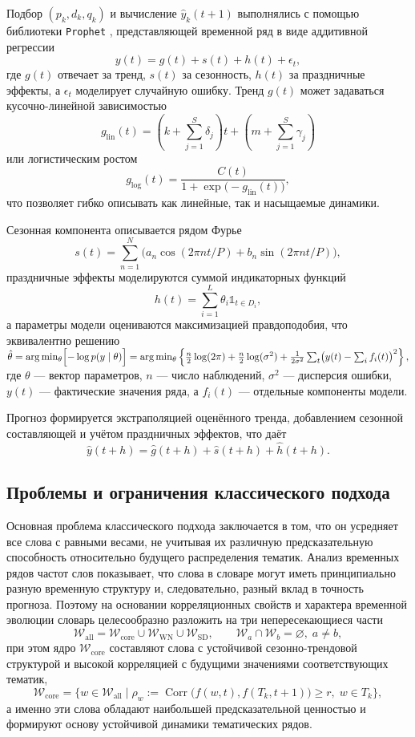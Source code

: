 \documentclass[14pt,a4paper]{article}
\begin{document}
Подбор $(p_k,d_k,q_k)$ и вычисление $\widehat{y}_k(t+1)$ выполнялись с помощью библиотеки \texttt{Prophet} \cite{prophet}, представляющей временной ряд в виде аддитивной регрессии
\[
y(t)=g(t)+s(t)+h(t)+\epsilon_t,
\]
где $g(t)$ отвечает за тренд, $s(t)$ за сезонность, $h(t)$ за праздничные эффекты, а $\epsilon_t$ моделирует случайную ошибку. Тренд $g(t)$ может задаваться кусочно-линейной зависимостью
\[
g_{\text{lin}}(t)=(k+\sum_{j=1}^{S}\delta_j)t+(m+\sum_{j=1}^{S}\gamma_j)
\]
или логистическим ростом
\[
g_{\text{log}}(t)=\frac{C(t)}{1+\exp\!\bigl(-g_{\text{lin}}(t)\bigr)},
\]
что позволяет гибко описывать как линейные, так и насыщаемые динамики.

Сезонная компонента описывается рядом Фурье 
\[
s(t)=\sum_{n=1}^{N}\bigl(a_n\cos(2\pi n t/P)+b_n\sin(2\pi n t/P)\bigr),
\]
праздничные эффекты моделируются суммой индикаторных функций
\[
h(t)=\sum_{i=1}^{L}\theta_i\mathbb 1_{t\in D_i},
\]
а параметры модели оцениваются максимизацией правдоподобия, что эквивалентно решению
\(
\hat{\theta}=\arg\min_{\theta}\Bigl[-\log p(y\mid\theta)\Bigr]=\arg\min_{\theta}\left\{\tfrac{n}{2}\log(2\pi)+\tfrac{n}{2}\log(\sigma^{2})+\tfrac{1}{2\sigma^{2}}\sum_{t}\bigl(y(t)-\sum_{i}f_i(t)\bigr)^{2}\right\},
\)
где $\theta$ — вектор параметров, $n$ — число наблюдений, $\sigma^{2}$ — дисперсия ошибки, $y(t)$ — фактические значения ряда, а $f_i(t)$ — отдельные компоненты модели.

Прогноз формируется экстраполяцией оценённого тренда, добавлением сезонной составляющей и учётом праздничных эффектов, что даёт
\[
\hat{y}(t+h)=\hat{g}(t+h)+\hat{s}(t+h)+\hat{h}(t+h).
\]

\newpage
\subsection{Проблемы и ограничения классического подхода}\label{ssec:limits}
Основная проблема классического подхода заключается в том, что он усредняет все слова с равными весами, не учитывая их различную предсказательную способность относительно будущего распределения тематик. Анализ временных рядов частот слов показывает, что слова в словаре могут иметь принципиально разную временную структуру и, следовательно, разный вклад в точность прогноза. Поэтому на основании корреляционных свойств и характера временной эволюции словарь целесообразно разложить на три непересекающиеся части 
\[
\mathcal{W}_{\mathrm{all}}=\mathcal{W}_{\mathrm{core}}\cup\mathcal{W}_{\mathrm{WN}}\cup\mathcal{W}_{\mathrm{SD}},\qquad \mathcal{W}_{a}\cap\mathcal{W}_{b}=\varnothing,\;a\neq b,
\]
при этом ядро $\mathcal{W}_{\mathrm{core}}$ составляют слова с устойчивой сезонно-трендовой структурой и высокой корреляцией с будущими значениями соответствующих тематик,
\[
\mathcal{W}_{\mathrm{core}}=\bigl\{w\in\mathcal{W}_{\mathrm{all}}\mid \rho_w:=\operatorname{Corr}\bigl(f(w,t),f(T_k,t+1)\bigr)\ge r,\;w\in T_k\bigr\},
\]
а именно эти слова обладают наибольшей предсказательной ценностью и формируют основу устойчивой динамики тематических рядов.
\end{document}
